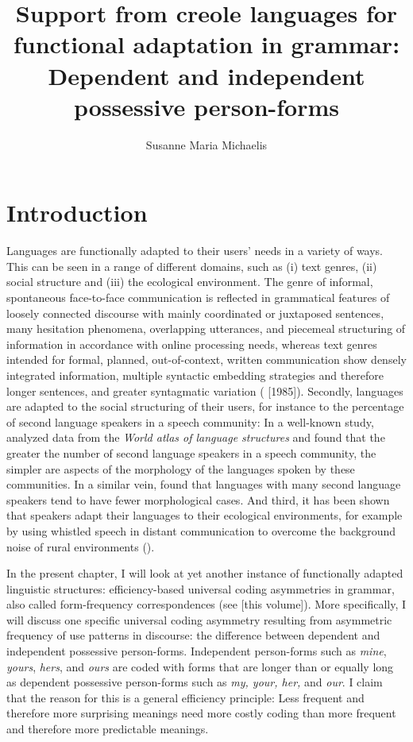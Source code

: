 \documentclass[output=paper]{langsci/langscibook}
\author{Susanne Maria Michaelis\affiliation{Leipzig University \& Max Planck Institute for the Science of Human History (Jena)}}
\title{Support from creole languages for functional adaptation in grammar: Dependent and independent possessive person-forms}
\begin{document}
\maketitle 




\section{Introduction}

Languages are functionally adapted to their users’ needs in a variety of ways. This can be seen in a range of different domains, such as (i) text genres, (ii) social structure and (iii) the ecological environment. The genre of informal, spontaneous face-to-face communication is reflected in grammatical features of loosely connected discourse with mainly coordinated or juxtaposed sentences, many hesitation phenomena, overlapping utterances, and piecemeal structuring of information in accordance with online processing needs, whereas text genres intended for formal, planned, out-of-context, written communication show densely integrated information, multiple syntactic embedding strategies and therefore longer sentences, and greater syntagmatic variation (\citealt{KochOesterreicher2012} [1985]). Secondly, languages are adapted to the social structuring of their users, for instance to the percentage of second language speakers in a speech community: In a well-known study, \citet{LupyanDale2010} analyzed data from the \textit{World atlas of language structures} \citep{HaspelmathEtAl2005} and found that the greater the number of second language speakers in a speech community, the simpler are aspects of the morphology of the languages spoken by these communities. In a similar vein, \citet{BentzWinter2013} found that languages with many second language speakers tend to have fewer morphological cases. And third, it has been shown that speakers adapt their languages to their ecological environments, for example by using whistled speech in distant communication to overcome the background noise of rural environments (\citealt{Meyer2005,Meyer2008}). 

In the present chapter, I will look at yet another instance of functionally adapted linguistic structures: efficiency-based universal coding asymmetries in grammar, also called form-frequency correspondences (see \citealt{Haspelmath2018} [this volume]). More specifically, I will discuss one specific universal coding asymmetry resulting from asymmetric frequency of use patterns in discourse: the difference between dependent and independent possessive person-forms. Independent person-forms such as \textit{mine}, \textit{yours}, \textit{hers}, and \textit{ours} are coded with forms that are longer than or equally long as dependent possessive person-forms such as \textit{my, your, her,} and \textit{our}. I claim that the reason for this is a general efficiency principle: Less frequent and therefore more surprising meanings need more costly coding than more frequent and therefore more predictable meanings. 
\end{document}
